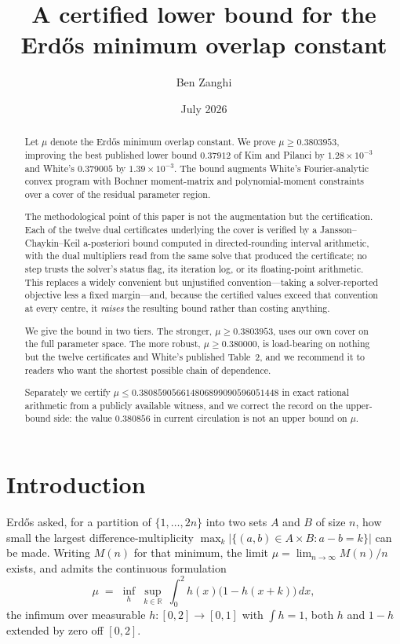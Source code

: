 \documentclass[11pt]{article}
\title{A certified lower bound for the Erd\H{o}s minimum overlap constant}
\author{Ben Zanghi}
\date{July 2026}
\theoremstyle{definition}
\begin{document}
\maketitle

\begin{abstract}
Let $\mu$ denote the Erd\H{o}s minimum overlap constant. We prove
$\mu \ge 0.3803953$, improving the best published lower bound
$0.37912$ of Kim and Pilanci by $1.28 \times 10^{-3}$ and White's
$0.379005$ by $1.39 \times 10^{-3}$. The bound augments White's
Fourier-analytic convex program with Bochner moment-matrix and
polynomial-moment constraints over a cover of the residual parameter
region.

The methodological point of this paper is not the augmentation but the
certification. Each of the twelve dual certificates underlying the cover
is verified by a Jansson--Chaykin--Keil a-posteriori bound computed in
directed-rounding interval arithmetic, with the dual multipliers read
from the same solve that produced the certificate; no step trusts the
solver's status flag, its iteration log, or its floating-point
arithmetic. This replaces a widely convenient but unjustified
convention---taking a solver-reported objective less a fixed
margin---and, because the certified values exceed that convention at
every centre, it \emph{raises} the resulting bound rather than costing
anything.

We give the bound in two tiers. The stronger, $\mu \ge 0.3803953$, uses
our own cover on the full parameter space. The more robust,
$\mu \ge 0.380000$, is load-bearing on nothing but the twelve
certificates and White's published Table~2, and we recommend it to
readers who want the shortest possible chain of dependence.

Separately we certify $\mu \le 0.380859056614806899090596051448$ in
exact rational arithmetic from a publicly available witness, and we
correct the record on the upper-bound side: the value $0.380856$ in
current circulation is not an upper bound on $\mu$.
\end{abstract}

\section{Introduction}\label{sec:intro}

Erd\H{o}s asked, for a partition of $\{1,\dots,2n\}$ into two sets $A$
and $B$ of size $n$, how small the largest difference-multiplicity
$\max_k |\{(a,b) \in A\times B : a-b = k\}|$ can be made. Writing $M(n)$
for that minimum, the limit $\mu = \lim_{n\to\infty} M(n)/n$ exists, and
admits the continuous formulation
\begin{equation}\label{eq:mu}
  \mu \;=\; \inf_{h}\ \sup_{k \in \mathbb{R}}\
  \int_0^2 h(x)\bigl(1-h(x+k)\bigr)\,dx,
\end{equation}
the infimum over measurable $h:[0,2]\to[0,1]$ with $\int h = 1$, both
$h$ and $1-h$ extended by zero off $[0,2]$.
\end{document}
